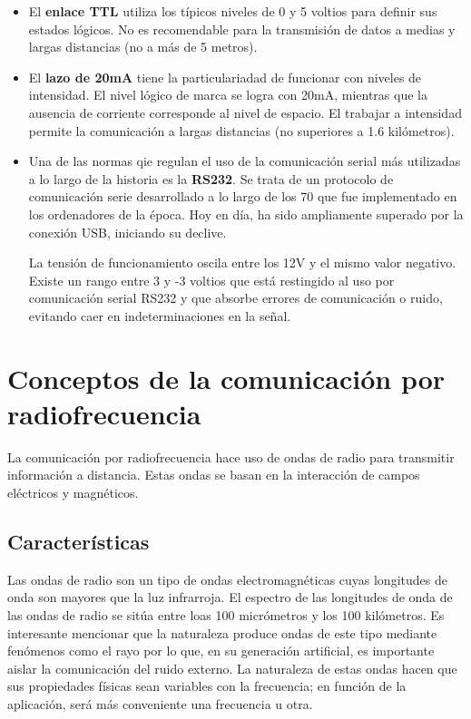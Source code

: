 \begin{itemize}
\item El \textbf{enlace TTL} utiliza los típicos niveles de 0 y 5 voltios para definir sus estados lógicos. No es recomendable para la transmisión de datos a medias y largas distancias (no a más de 5 metros).

\item El \textbf{lazo de 20mA} tiene la particulariadad de funcionar con niveles de intensidad. El nivel lógico de marca se logra con 20mA, mientras que la ausencia de corriente corresponde al nivel de espacio. El trabajar a intensidad permite la comunicación a largas distancias (no superiores a 1.6 kilómetros).

\item Una de las normas qie regulan el uso de la comunicación serial más utilizadas a lo largo de la historia es la \textbf{RS232}. Se trata de un protocolo de comunicación serie desarrollado a lo largo de los 70 que fue implementado en los ordenadores de la época. Hoy en día, ha sido ampliamente superado por la conexión USB, iniciando su declive.

La tensión de funcionamiento oscila entre los 12V y el mismo valor negativo. Existe un rango entre 3 y -3 voltios que está restingido al uso por comunicación serial RS232 y que absorbe errores de comunicación o ruido, evitando caer en indeterminaciones en la señal.
\end{itemize}

\section{Conceptos de la comunicación por radiofrecuencia}\label{sec:radiofrec}

La comunicación por radiofrecuencia hace uso de ondas de radio para transmitir información a distancia. Estas ondas se basan en la interacción de campos eléctricos y magnéticos.

\subsection{Características}

Las ondas de radio son un tipo de ondas electromagnéticas cuyas longitudes de onda son mayores que la luz infrarroja. El espectro de las longitudes de onda de las ondas de radio se sitúa entre loas 100 micrómetros y los 100 kilómetros. Es interesante mencionar que la naturaleza produce ondas de este tipo mediante fenómenos como el rayo por lo que, en su generación artificial, es importante aislar la comunicación del ruido externo. La naturaleza de estas ondas hacen que sus propiedades físicas sean variables con la frecuencia; en función de la aplicación, será más conveniente una frecuencia u otra.

